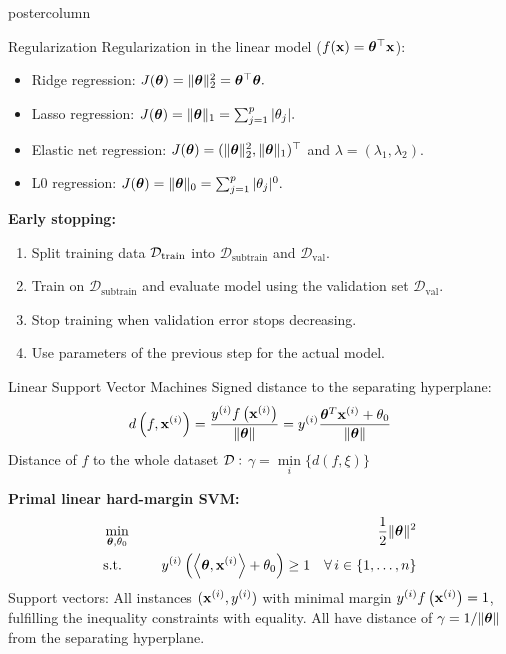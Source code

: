 \documentclass{beamer}
\begin{document}
\begin{frame}[fragile]{}
\begin{columns}
\begin{column}{.31\textwidth}
\begin{beamercolorbox}[center]{postercolumn}
\begin{minipage}{.98\textwidth}
{\begin{myblock}{Regularization}
	Regularization in the linear model ($f(\mathbf{x}) = \bm{\theta}^\top \mathbf{x}$):
	\begin{itemize}
		\setlength{\itemindent}{+.3in}
		\item Ridge regression: $J(\bm{\theta}) =  \|\bm{\theta}\|_2^2 = \bm{\theta}^\top \bm{\theta}.$
		\item Lasso regression: $J(\bm{\theta}) =  \|\bm{\theta}\|_1 = \sum_{j=1}^p |\theta_j|.$
		\item Elastic net regression: $J(\bm{\theta}) =  (\|\bm{\theta}\|_2^2,  \|\bm{\theta}\|_1)^\top$ and $\lambda=(\lambda_1,\lambda_2).$
		\item L0 regression: $J(\bm{\theta}) = \|\bm{\theta}\|_0 = \sum_{j=1}^p |\theta_j|^0.$
	\end{itemize}
	\textbf{Early stopping:}
	\begin{enumerate}
		\setlength{\itemindent}{+.3in}
		\item Split training data $\mathcal{D}_{\text{train}}$ into $\mathcal{D}_{\text{subtrain}}$ and $\mathcal{D}_{\text{val}}.$ 
		\item Train on $\mathcal{D}_{\text{subtrain}}$ and evaluate model using the validation set $\mathcal{D}_{\text{val}}$.
		\item Stop training when validation error stops decreasing.
		\item Use parameters of the previous step for the actual model.
	\end{enumerate}
%
\end{myblock} 
%
%
\begin{myblock}{Linear Support Vector Machines}
	Signed distance to the separating hyperplane:
	$$
	d \left(f, \mathbf{x}^{(i)} \right) = \frac{y^{(i)} f\left(\mathbf{x}^{(i)}\right)}{\|\bm{\theta}\|} = y^{(i)} \frac{\bm{\theta}^T \mathbf{x}^{(i)} + \theta_0}{\|\bm{\theta}\|}
	$$ 
	Distance of $f$ to the whole dataset $\mathcal{D}:$ 
	$
	\gamma = \min\limits_i \Big\{ d \left(f, \xi \right) \Big\}
	$
	
	\textbf{Primal linear hard-margin SVM:}
	  \begin{eqnarray*}
		& \min\limits_{\bm{\theta}, \theta_0} \quad & \frac{1}{2} \|\bm{\theta}\|^2 \\
		& \text{s.t.} & \,\,y^{(i)}  \left( \left\langle \bm{\theta}, \mathbf{x}^{(i)} \right\rangle + \theta_0 \right) \geq 1 \quad \forall\, i \in \{1, \ldots, n\}
	\end{eqnarray*}
	Support vectors: All instances $(\mathbf{x}^{(i)}, y^{(i)})$ with minimal margin
	$y^{(i)}  f\left(\mathbf{x}^{(i)}\right) = 1$, fulfilling the inequality constraints with equality. 
	All have distance of $\gamma = 1 / \|\bm{\theta}\|$ from the separating hyperplane.
	

\end{myblock}}
\end{minipage}
\end{beamercolorbox}
\end{column}
\end{columns}
\end{frame}
\end{document}
